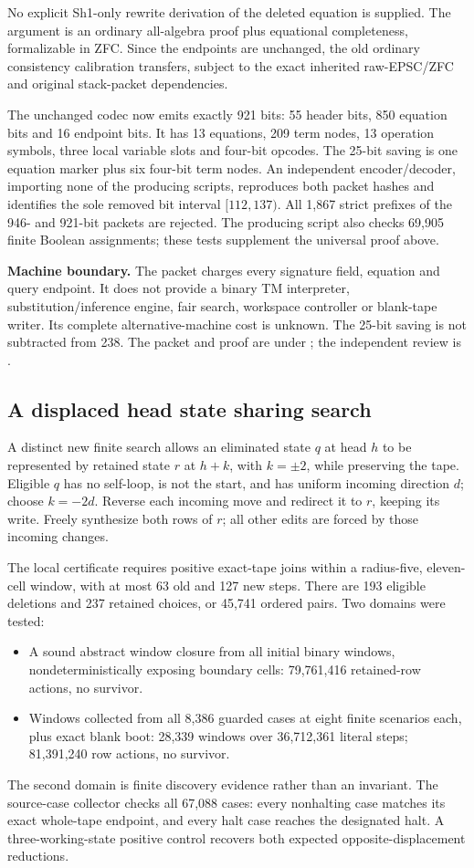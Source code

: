 No explicit Sh1-only rewrite derivation of the deleted equation is supplied. The argument is an ordinary all-algebra proof plus equational completeness, formalizable in ZFC. Since the endpoints are unchanged, the old ordinary consistency calibration transfers, subject to the exact inherited raw-EPSC/ZFC and original stack-packet dependencies.

The unchanged codec now emits exactly 921 bits: 55 header bits, 850 equation bits and 16 endpoint bits. It has 13 equations, 209 term nodes, 13 operation symbols, three local variable slots and four-bit opcodes. The 25-bit saving is one equation marker plus six four-bit term nodes. An independent encoder/decoder, importing none of the producing scripts, reproduces both packet hashes and identifies the sole removed bit interval $[112,137)$. All 1,867 strict prefixes of the 946- and 921-bit packets are rejected. The producing script also checks 69,905 finite Boolean assignments; these tests supplement the universal proof above.

\textbf{Machine boundary.} The packet charges every signature field, equation and query endpoint. It does not provide a binary TM interpreter, substitution/inference engine, fair search, workspace controller or blank-tape writer. Its complete alternative-machine cost is unknown. The 25-bit saving is not subtracted from 238. The packet and proof are under ; the independent review is .

\subsection{A displaced head state sharing search}
A distinct new finite search allows an eliminated state $q$ at head $h$ to be represented by retained state $r$ at $h+k$, with $k=\pm2$, while preserving the tape. Eligible $q$ has no self-loop, is not the start, and has uniform incoming direction $d$; choose $k=-2d$. Reverse each incoming move and redirect it to $r$, keeping its write. Freely synthesize both rows of $r$; all other edits are forced by those incoming changes.

The local certificate requires positive exact-tape joins within a radius-five, eleven-cell window, with at most 63 old and 127 new steps. There are 193 eligible deletions and 237 retained choices, or 45,741 ordered pairs. Two domains were tested:
\begin{itemize}
\item A sound abstract window closure from all initial binary windows, nondeterministically exposing boundary cells: 79,761,416 retained-row actions, no survivor.
\item Windows collected from all 8,386 guarded cases at eight finite scenarios each, plus exact blank boot: 28,339 windows over 36,712,361 literal steps; 81,391,240 row actions, no survivor.
\end{itemize}
The second domain is finite discovery evidence rather than an invariant. The source-case collector checks all 67,088 cases: every nonhalting case matches its exact whole-tape endpoint, and every halt case reaches the designated halt. A three-working-state positive control recovers both expected opposite-displacement reductions.

